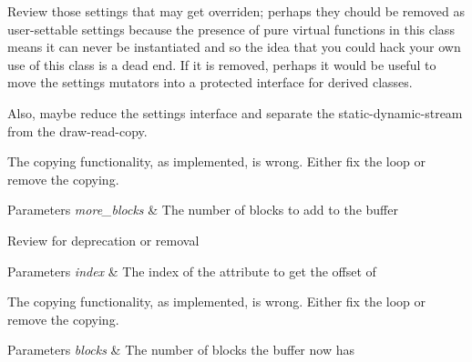
\begin{DoxyRefList}
\item[\label{todo__todo000013}%
\hypertarget{todo__todo000013}{}%
Class \hyperlink{classgfx_1_1buffer}{gfx\-:\-:buffer} ]Review those settings that may get overriden; perhaps they chould be removed as user-\/settable settings because the presence of pure virtual functions in this class means it can never be instantiated and so the idea that you could hack your own use of this class is a dead end. If it is removed, perhaps it would be useful to move the settings mutators into a protected interface for derived classes.

Also, maybe reduce the settings interface and separate the static-\/dynamic-\/stream from the draw-\/read-\/copy.  
\item[\label{todo__todo000010}%
\hypertarget{todo__todo000010}{}%
Member \hyperlink{classgfx_1_1buffer_a08cffdcb5184e6ff8fec0df1ad817163}{gfx\-:\-:buffer\-:\-:add\-\_\-blocks} (G\-Lsizeiptr const more\-\_\-blocks)]The copying functionality, as implemented, is wrong. Either fix the loop or remove the copying. 
\begin{DoxyParams}{Parameters}
{\em more\-\_\-blocks} & The number of blocks to add to the buffer  \\
\hline
\end{DoxyParams}

\item[\label{todo__todo000012}%
\hypertarget{todo__todo000012}{}%
Member \hyperlink{classgfx_1_1buffer_afafe95bbac44b4392e48f04cbffb16a9}{gfx\-:\-:buffer\-:\-:attribute\-\_\-offset} (G\-Luint index) const ]Review for deprecation or removal 
\begin{DoxyParams}{Parameters}
{\em index} & The index of the attribute to get the offset of  \\
\hline
\end{DoxyParams}

\item[\label{todo__todo000009}%
\hypertarget{todo__todo000009}{}%
Member \hyperlink{classgfx_1_1buffer_a9c4e3ba0b7794299c80cd400bd6625f8}{gfx\-:\-:buffer\-:\-:blocks} (G\-Lsizeiptr const blocks)]The copying functionality, as implemented, is wrong. Either fix the loop or remove the copying. 
\begin{DoxyParams}{Parameters}
{\em blocks} & The number of blocks the buffer now has  \\
\hline
\end{DoxyParams}


\end{DoxyRefList}
